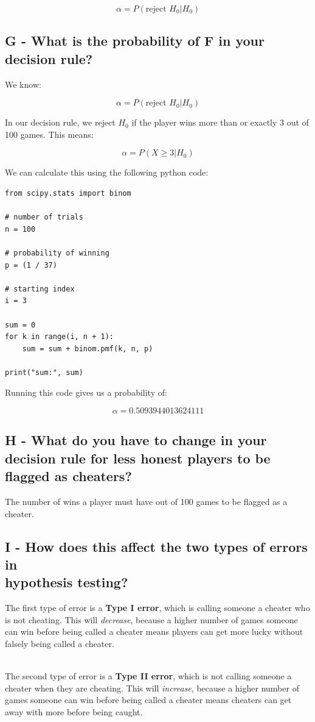 \documentclass[12pt]{article}
\begin{document}
\[ \alpha = P(\text{reject } H_0 | H_0) \]

\newpage
\subsection*{G - What is the probability of F in your decision rule?}
We know:

\[ \alpha = P(\text{reject } H_0 | H_0) \]

\noindent
In our decision rule, we reject $H_0$ if the player wins more than or exactly 3 out of 100 games.
This means:

\[ \alpha = P(X \geq 3 | H_0) \]

\noindent
We can calculate this using the following python code:

\begin{verbatim}
from scipy.stats import binom

# number of trials
n = 100
    
# probability of winning
p = (1 / 37)
    
# starting index
i = 3
    
sum = 0
for k in range(i, n + 1):
    sum = sum + binom.pmf(k, n, p)
    
print("sum:", sum)    
\end{verbatim}

\noindent
Running this code gives us a probability of:

\[ \alpha = 0.5093944013624111 \]

\subsection*{H - What do you have to change in your decision rule for less honest players to be flagged as cheaters?}
The number of wins a player must have out of 100 games to be flagged as a cheater.

\subsection*{I - How does this affect the two types of errors in \\hypothesis testing?}
The first type of error is a \textbf{Type I error}, which is calling someone a cheater who is not cheating.
This will \textit{decrease}, because a higher number of games someone can win before being called a cheater means players can get more lucky without falsely being called a cheater.

\noindent
\\
The second type of error is a \textbf{Type II error}, which is not calling someone a cheater when they are cheating.
This will \textit{increase}, because a higher number of games someone can win before being called a cheater means cheaters can get away with more before being caught.
\end{document}
